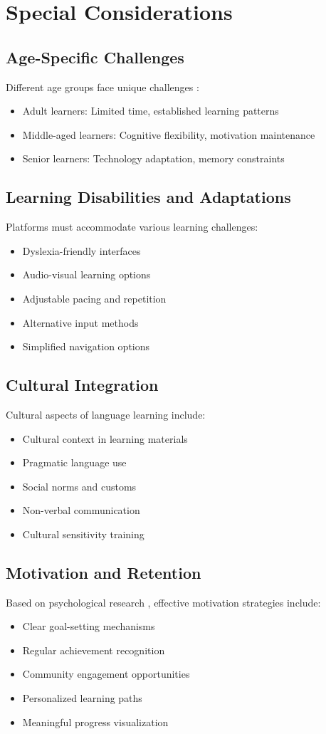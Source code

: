 \section{Special Considerations}
\subsection{Age-Specific Challenges}
Different age groups face unique challenges \citep{brown2014principles}:
\begin{itemize}
    \item Adult learners: Limited time, established learning patterns
    \item Middle-aged learners: Cognitive flexibility, motivation maintenance
    \item Senior learners: Technology adaptation, memory constraints
\end{itemize}

\subsection{Learning Disabilities and Adaptations}
Platforms must accommodate various learning challenges:
\begin{itemize}
    \item Dyslexia-friendly interfaces
    \item Audio-visual learning options
    \item Adjustable pacing and repetition
    \item Alternative input methods
    \item Simplified navigation options
\end{itemize}

\subsection{Cultural Integration}
Cultural aspects of language learning include:
\begin{itemize}
    \item Cultural context in learning materials
    \item Pragmatic language use
    \item Social norms and customs
    \item Non-verbal communication
    \item Cultural sensitivity training
\end{itemize}

\subsection{Motivation and Retention}
Based on psychological research \citep{dörnyei2015psychology}, effective motivation strategies include:
\begin{itemize}
    \item Clear goal-setting mechanisms
    \item Regular achievement recognition
    \item Community engagement opportunities
    \item Personalized learning paths
    \item Meaningful progress visualization
\end{itemize} 
